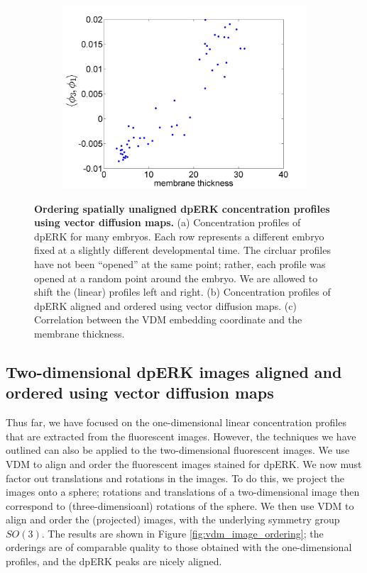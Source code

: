 \documentclass[10pt]{article}
\begin{document}
\begin{figure}[H]
\begin{subfigure}{0.3\textwidth}
\includegraphics[width=\textwidth]{VDM_time_corr}
\caption{}
\end{subfigure}
\caption{{\bf Ordering spatially unaligned dpERK concentration profiles using vector diffusion maps.} (a) Concentration profiles of dpERK for many embryos. Each row represents a different embryo fixed at a slightly different developmental time. The circluar profiles have not been ``opened'' at the same point; rather, each profile was opened at a random point around the embryo. We are allowed to shift the (linear) profiles left and right.
(b) Concentration profiles of dpERK aligned and ordered using vector diffusion maps.
(c) Correlation between the VDM embedding coordinate and the membrane thickness.}
\label{fig:vdm_ordering}
\end{figure}

\subsection*{Two-dimensional dpERK images aligned and ordered using vector diffusion maps}

Thus far, we have focused on the one-dimensional linear concentration profiles that are extracted from the fluorescent images.
%
However, the techniques we have outlined can also be applied to the two-dimensional fluorescent images. 
%
We use VDM to align and order the fluorescent images stained for dpERK. 
%
We now must factor out translations and rotations in the images. 
%
To do this, we project the images onto a sphere;
rotations and translations of a two-dimensional image then correspond to (three-dimensioanl) rotations of the sphere.
%
We then use VDM to align and order the (projected) images, with the underlying symmetry group $SO(3)$. 
%
The results are shown in Figure \ref{fig:vdm_image_ordering};
the orderings are of comparable quality to those obtained with the one-dimensional profiles, and the dpERK peaks are nicely aligned.
\end{document}
